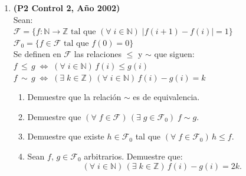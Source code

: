 \documentclass[10pt]{article}
\newcommand{\N}{\mathbb N}
\newcommand{\Z}{\mathbb Z}
\theoremstyle{plain}
\newcommand{\cur}[1]{\mathcal{#1}}
\theoremstyle{definition}
\begin{document}
\begin{enumerate}[label=\textbf{P\arabic*.-}]
\item \textbf{(P2 Control 2, Año 2002)}\\
Sean:\\
$\cur{F}=\{f:\N\longrightarrow \Z \mbox{ tal que } (\forall \; i\in\N)\; |f(i+1)-f(i)|=1\}$\\
$\cur{F}_0=\{f\in\cur{F} \mbox{ tal que } f(0)=0\}$\\
Se definen en $\cur{F}$ las relaciones $\leq$ y $\sim$ que siguen:\\
$f\,\leq\,g \; \Longleftrightarrow \; (\forall \; i\in\N)\, f(i)\leq g(i)$\\
$f\,\sim\,g \; \Longleftrightarrow \; (\exists \; k\in\Z)\,(\forall \; i\in\N)\, f(i)-g(i)=k$
\begin{enumerate}
\item Demuestre que la relación $\sim$ es de equivalencia.
\item Demuestre que $(\forall \; f\in\cur{F})\,(\exists\;g\in\cur{F}_0)\;f\sim g.$
\item Demuestre que existe $h\in\cur{F}_0$ tal que $(\forall \; f\in\cur{F}_0)\,h\leq f.$
\item Sean $f,\,g\in\cur{F}_0$ arbitrarios. Demuestre que:
$$(\forall \; i\in\N)\,(\exists \; k\in\Z)\,f(i)-g(i)=2k.$$
\end{enumerate}


\end{enumerate}
\end{document}
